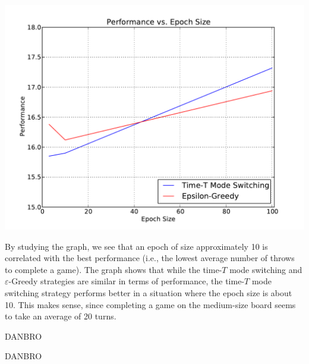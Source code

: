 \documentclass[solution, letterpaper]{cs121}
\begin{document}
\begin{center}
\includegraphics[scale=0.8]{source/perf-v-epoch-size.pdf}
\end{center}

By studying the graph, we see that an epoch of size approximately 10 is correlated with the best performance (i.e., the lowest average number of throws to complete a game). The graph shows that while the time-$T$ mode switching and $\varepsilon$-Greedy strategies are similar in terms of performance, the time-$T$ mode switching strategy performs better in a situation where the epoch size is about 10. This makes sense, since completing a game on the medium-size board seems to take an average of 20 turns.

\subproblem{} %
DANBRO

\subproblem{} %
DANBRO
\end{document}
